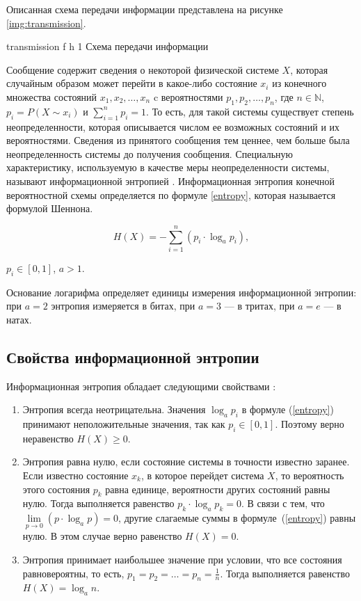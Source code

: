 Описанная схема передачи информации представлена на рисунке \ref{img:transmission}.

    {transmission}
    {f}
    {h}
    {1\textwidth}
    {Схема передачи информации}
    
Сообщение содержит сведения о некоторой физической системе $X$, которая случайным образом может перейти в какое-либо состояние $x_{i}$ из конечного множества состояний $x_{1}, x_{2}, \dots, x_{n}$ c вероятностями $p_{1}, p_{2}, \dots, p_{n}$, где $n \in \mathbb{N}$, $p_{i} = P(X \sim x_{i})$ и $\sum_{i = 1}^n p_{i} = 1$. То есть, для такой системы существует степень неопределенности, которая описывается числом ее возможных состояний и их вероятностями. Сведения из принятого сообщения тем ценнее, чем больше была неопределенность системы до получения сообщения. Специальную характеристику, используемую в качестве меры неопределенности системы, называют информационной энтропией \cite{definition}. Информационная энтропия конечной вероятностной схемы определяется по формуле \ref{entropy}, которая называется формулой Шеннона.

\begin{equation}\label{entropy}
	H(X) = -\sum_{i = 1}^n (p_{i} \cdot \log_{a}p_{i}),
\end{equation}

 $p_{i} \in [0, 1]$, $a > 1$.

Основание логарифма определяет единицы измерения информационной энтропии: при $a = 2$ энтропия измеряется в битах, при $a = 3$ --- в тритах, при $a = e$ --- в натах.

\subsection{Свойства информационной энтропии}\label{properties}

Информационная энтропия обладает следующими свойствами \cite{properties}:

\begin{enumerate}
	\item Энтропия всегда неотрицательна. Значения $\log_{a} p_{i}$ в формуле (\ref{entropy}) принимают неположительные значения, так как $p_{i} \in [0, 1]$. Поэтому верно неравенство $H(X) \geqslant 0$.

	\item\label{property2} Энтропия равна нулю, если состояние системы в точности известно заранее. Если известно состояние $x_{k}$, в которое перейдет система $X$, то вероятность этого состояния $p_{k}$ равна единице, вероятности других состояний равны нулю. Тогда выполняется равенство $p_{k} \cdot \log_{a} p_{k} = 0$. В связи с тем, что $\lim\limits_{p \to 0} (p \cdot \log_{a}p) = 0$, другие слагаемые суммы в формуле~(\ref{entropy}) равны нулю. В этом случае верно равенство $H(X) = 0$.

	\item\label{property3} Энтропия принимает наибольшее значение при условии, что все состояния равновероятны, то есть, $p_{1} = p_{2} = \dots = p_{n} = \frac{1}{n}$. Тогда выполняется равенство $H(X) = \log_{a} n$.
\end{enumerate}

